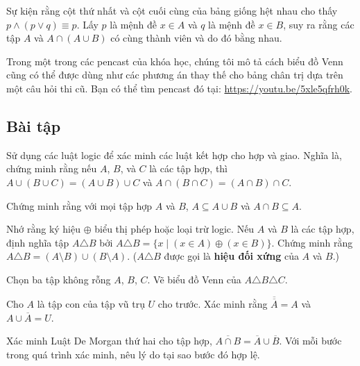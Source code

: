 Sự kiện rằng cột thứ nhất và cột cuối cùng của bảng giống hệt nhau cho thấy $p \land (p \lor q) \equiv p$. Lấy $p$ là mệnh đề $x \in A$ và $q$ là mệnh đề $x \in B$, suy ra rằng các tập $A$ và $A \cap (A \cup B)$ có cùng thành viên và do đó bằng nhau.

\begin{infobox}
Trong một trong các pencast của khóa học, chúng tôi mô tả cách biểu đồ Venn cũng có thể được dùng như các phương án thay thế cho bảng chân trị dựa trên một câu hỏi thi cũ. Bạn có thể tìm pencast đó tại: \url{https://youtu.be/5xle5qfrh0k}.
\end{infobox}

\subsection*{Bài tập}

\begin{exercise}
Sử dụng các luật logic để xác minh các luật kết hợp cho hợp và giao. Nghĩa là, chứng minh rằng nếu $A$, $B$, và $C$ là các tập hợp, thì $A \cup (B \cup C) = (A \cup B) \cup C$ và $A \cap (B \cap C) = (A \cap B) \cap C$.
\end{exercise}

\begin{exercise}
Chứng minh rằng với mọi tập hợp $A$ và $B$, $A \subseteq A \cup B$ và $A \cap B \subseteq A$.
\end{exercise}

\begin{exercise}
Nhớ rằng ký hiệu $\oplus$ biểu thị phép hoặc loại trừ logic. Nếu $A$ và $B$ là các tập hợp, định nghĩa tập $A \triangle B$ bởi $A \triangle B = \{x \mid (x \in A) \oplus (x \in B)\}$. Chứng minh rằng $A \triangle B = (A \setminus B) \cup (B \setminus A)$. ($A \triangle B$ được gọi là \textbf{hiệu đối xứng} của $A$ và $B$.)
\end{exercise}

\begin{exercise}
Chọn ba tập không rỗng $A$, $B$, $C$. Vẽ biểu đồ Venn của $A \triangle B \triangle C$.
\end{exercise}

\begin{exercise}
Cho $A$ là tập con của tập vũ trụ $U$ cho trước. Xác minh rằng $\overline{\overline{A}} = A$ và $A \cup \overline{A} = U$.
\end{exercise}

\begin{exercise}
Xác minh Luật De Morgan thứ hai cho tập hợp, $\overline{A \cap B} = \overline{A} \cup \overline{B}$. Với mỗi bước trong quá trình xác minh, nêu lý do tại sao bước đó hợp lệ.
\end{exercise}

